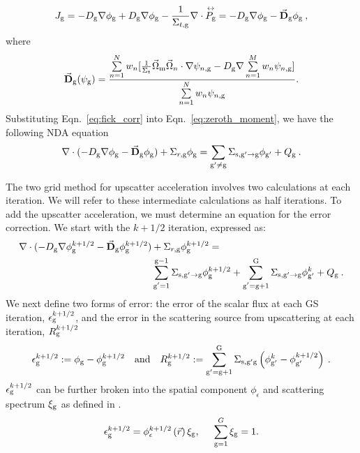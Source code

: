   \begin{equation}
  J_{\mathrm{g}} = -D_{\mathrm{g}} \nabla \phi_{\mathrm{g}} + D_{\mathrm{g}} \nabla \phi_{\mathrm{g}} - \frac{1}{\Sigma_{t, \mathrm{g}}} \nabla \cdot \overset{\text{\scriptsize$\leftrightarrow$}}{P_{\mathrm{g}}} \\
  = -D_{\mathrm{g}} \nabla \phi_{\mathrm{g}} - \vec{\textbf{D}}_{\mathrm{g}} \phi_{\mathrm{g}} \:,
  \label{eq:fick_corr}
  \end{equation}
  where 
 \begin{equation}
  \vec{\textbf{D}}_{\mathrm{g}} (\psi_{\mathrm{g}}) = \frac{\sum\limits_{n=1}^N w_n [\frac{1}{\Sigma_t} \vec{\Omega}_{\mathrm{m}} \vec{\Omega}_n \cdot \nabla\psi_{n, \mathrm{g}} - D_{\mathrm{g}} \nabla \sum\limits_{n=1}^M w_n\psi_{n, \mathrm{g}}]}{\sum\limits_{n=1}^N w_n \psi_{n, \mathrm{g}}}.
  \end{equation} 
 Substituting Eqn.~\eqref{eq:fick_corr} into Eqn.~\eqref{eq:zeroth_moment}, we have the following NDA equation
  \begin{equation}
  \nabla\cdot(-D_{\mathrm{g}} \nabla \phi_{\mathrm{g}} - \vec{\bf D}_{\mathrm{g}} \phi_{\mathrm{g}}) + \Sigma_{r,\mathrm{g}} \phi_{\mathrm{g}} = \sum\limits_{{\mathrm{g}'}\neq\mathrm{g}}\Sigma_{\mathrm{s},\mathrm{g}' \rightarrow \mathrm{g}}\phi_{\mathrm{g}'} + Q_{\mathrm{g}} \:. \label{eq:NDA}
  \end{equation}
  
  The two grid method for upscatter acceleration involves two calculations at each iteration. We will refer to these intermediate calculations as half iterations. To add the upscatter acceleration, we must determine an equation for the error correction. We start with the $k + 1/2$ iteration, expressed as:
  \begin{equation}
  \begin{split}
  \nabla\cdot(-D_{\mathrm{g}} \nabla \phi_{\mathrm{g}}^{k+1/2} - \vec{\bf D}_{\mathrm{g}} \phi_{\mathrm{g}}^{k+1/2}) &+ \Sigma_{r,\mathrm{g}} \phi_{\mathrm{g}}^{k+1/2} =  \\ &\sum\limits_{\substack{\mathrm{g}'=1}}^{\mathrm{g-1}} \Sigma_{\mathrm{s},\mathrm{g}' \to\mathrm{g}}\phi_{\mathrm{g}}^{k+1/2} + \sum\limits_{\substack{\mathrm{g}'=\mathrm{g}+1}}^{\mathrm{G}} \Sigma_{\mathrm{s},\mathrm{g}' \to\mathrm{g}}\phi_{\mathrm{g}'}^{k} + Q_{\mathrm{g}}\:. 
  \end{split}
  \label{eq:k1/2}
  \end{equation}
  We next define two forms of error: the error of the scalar flux at each GS iteration, $\epsilon_{\mathrm{g}}^{k+1/2}$, and the error in the scattering source from upscattering at each iteration, $R_{\mathrm{g}}^{k+1/2}$
  \begin{equation}
  \epsilon_{\mathrm{g}}^{k+1/2} := \phi_{\mathrm{g}} - \phi_{\mathrm{g}}^{k + 1/2} \quad \mathrm{and} \quad R_{\mathrm{g}}^{k+1/2} := \sum\limits_{\mathrm{g}'=\mathrm{g}+1}^{\mathrm{G}} \Sigma_{\mathrm{s},\mathrm{g}' \mathrm{g}}\left(\phi_{\mathrm{g}'}^k - \phi_{\mathrm{g}'}^{k + 1/2}\right)\:.
  \end{equation}
  $\epsilon_{\mathrm{g}}^{k + 1/2}$ can be further broken into the spatial component $\phi_{\epsilon}$ and scattering spectrum $\xi_{\mathrm{g}}$ as defined in \cite{morel-upscat, evans-upscat}.
  \begin{equation}
  \epsilon_{\mathrm{g}}^{k+1/2} = \phi_{\epsilon}^{k+1/2}\left(\vec{r}\right)\xi_{\mathrm{g}}, \hspace{5mm} \sum\limits_{\mathrm{g}=1}^G \xi_{\mathrm{g}} = 1.
  \label{eq:decomp}
  \end{equation}
  
